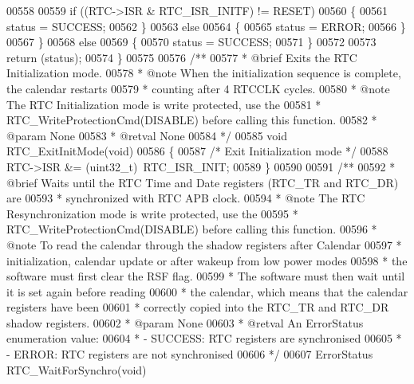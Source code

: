 \begin{DoxyCode}
00558 
00559     \textcolor{keywordflow}{if} ((RTC->ISR & RTC_ISR_INITF) != RESET)
00560     \{
00561       status = SUCCESS;
00562     \}
00563     \textcolor{keywordflow}{else}
00564     \{
00565       status = ERROR;
00566     \}
00567   \}
00568   \textcolor{keywordflow}{else}
00569   \{
00570     status = SUCCESS;
00571   \}
00572 
00573   \textcolor{keywordflow}{return} (status);
00574 \}
00575 
00576 \textcolor{comment}{/**}
00577 \textcolor{comment}{  * @brief  Exits the RTC Initialization mode.}
00578 \textcolor{comment}{  * @note   When the initialization sequence is complete, the calendar restarts }
00579 \textcolor{comment}{  *         counting after 4 RTCCLK cycles.  }
00580 \textcolor{comment}{  * @note   The RTC Initialization mode is write protected, use the }
00581 \textcolor{comment}{  *         RTC\_WriteProtectionCmd(DISABLE) before calling this function.      }
00582 \textcolor{comment}{  * @param  None}
00583 \textcolor{comment}{  * @retval None}
00584 \textcolor{comment}{  */}
00585 \textcolor{keywordtype}{void} RTC_ExitInitMode(\textcolor{keywordtype}{void})
00586 \{
00587   \textcolor{comment}{/* Exit Initialization mode */}
00588   RTC->ISR &= (uint32\_t)~RTC_ISR_INIT;
00589 \}
00590 
00591 \textcolor{comment}{/**}
00592 \textcolor{comment}{  * @brief  Waits until the RTC Time and Date registers (RTC\_TR and RTC\_DR) are }
00593 \textcolor{comment}{  *         synchronized with RTC APB clock.}
00594 \textcolor{comment}{  * @note   The RTC Resynchronization mode is write protected, use the }
00595 \textcolor{comment}{  *         RTC\_WriteProtectionCmd(DISABLE) before calling this function. }
00596 \textcolor{comment}{  * @note   To read the calendar through the shadow registers after Calendar }
00597 \textcolor{comment}{  *         initialization, calendar update or after wakeup from low power modes }
00598 \textcolor{comment}{  *         the software must first clear the RSF flag. }
00599 \textcolor{comment}{  *         The software must then wait until it is set again before reading }
00600 \textcolor{comment}{  *         the calendar, which means that the calendar registers have been }
00601 \textcolor{comment}{  *         correctly copied into the RTC\_TR and RTC\_DR shadow registers.   }
00602 \textcolor{comment}{  * @param  None}
00603 \textcolor{comment}{  * @retval An ErrorStatus enumeration value:}
00604 \textcolor{comment}{  *          - SUCCESS: RTC registers are synchronised}
00605 \textcolor{comment}{  *          - ERROR: RTC registers are not synchronised}
00606 \textcolor{comment}{  */}
00607 ErrorStatus RTC_WaitForSynchro(\textcolor{keywordtype}{void})

\end{DoxyCode}
